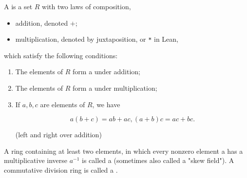 \begin{definition}[Ring]
    \label{ring}

    A  is a set $R$ with two laws of composition, 
    
    \begin{itemize}
        
    \item addition, denoted $+$;
    \item multiplication, denoted by juxtaposition, or \texttt{*} in Lean,
    
    \end{itemize}
    
    which satisfy the following conditions:

    \begin{enumerate}
    \item The elements of $R$ form a  under addition;

    \item The elements of $R$ form a  under multiplication;

    \item If $a, b, c$ are elements of $R$, we have

    $$
    a (b + c) = a b + a c, (a + b) c = a c + b c.
    $$

    (left and right  over addition)

    \end{enumerate}



\end{definition}

\begin{remark}
    \label{mk:ring}
    
    A ring containing at least two elements, in which every nonzero element a has a multiplicative inverse $a^{-1}$ is called a  (sometimes also called a "skew field").
    A commutative division ring is called a . 

\end{remark}